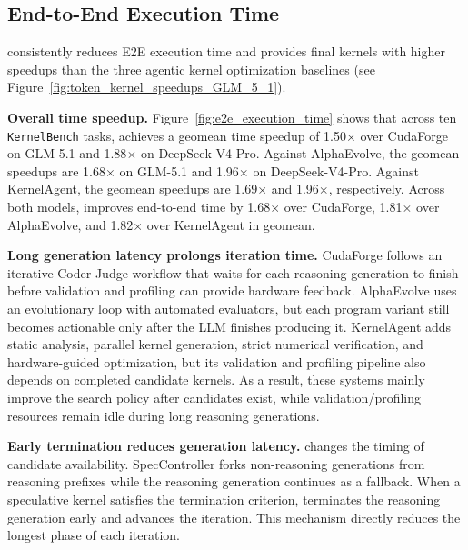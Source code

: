 \subsection{End-to-End Execution Time}\label{subsec:eval_execution_time}

\sysname{} consistently reduces E2E execution time and provides final kernels with 
higher speedups than the three agentic kernel optimization baselines (see Figure~\ref{fig:token_kernel_speedups_GLM_5_1}).

\noindent\textbf{Overall time speedup.}
Figure~\ref{fig:e2e_execution_time} shows that across ten \texttt{KernelBench} tasks, \sysname{} 
achieves a geomean time speedup of 1.50$\times$ over CudaForge on GLM-5.1 and 1.88$\times$ on
DeepSeek-V4-Pro.
Against AlphaEvolve, the geomean speedups are 1.68$\times$ on GLM-5.1 and
1.96$\times$ on DeepSeek-V4-Pro.
Against KernelAgent, the geomean speedups are 1.69$\times$ and 1.96$\times$,
respectively.
Across both models, \sysname{} improves end-to-end time by 1.68$\times$ over
CudaForge, 1.81$\times$ over AlphaEvolve, and 1.82$\times$ over KernelAgent in
geomean.

\noindent\textbf{Long generation latency prolongs iteration time.}
CudaForge follows an iterative Coder-Judge workflow that waits for each
reasoning generation to finish before validation and profiling can provide
hardware feedback.
AlphaEvolve uses an evolutionary loop with automated evaluators, but each
program variant still becomes actionable only after the LLM finishes producing
it.
KernelAgent adds static analysis, parallel kernel generation, strict numerical
verification, and hardware-guided optimization, but its validation and profiling
pipeline also depends on completed candidate kernels.
As a result, these systems mainly improve the search policy after candidates
exist, while validation/profiling resources remain idle during long reasoning
generations.

\noindent\textbf{Early termination reduces generation latency.}
\sysname{} changes the timing of candidate availability.
SpecController forks non-reasoning generations from reasoning prefixes while the
reasoning generation continues as a fallback.
When a speculative kernel satisfies the termination criterion, \sysname{}
terminates the reasoning generation early and advances the iteration.
This mechanism directly reduces the longest phase of each iteration.


